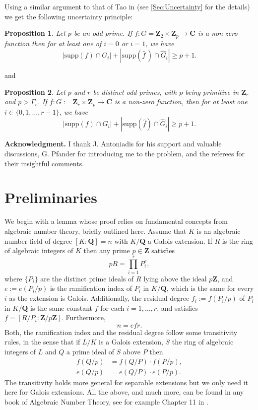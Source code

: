 \documentclass[10pt,a4paper]{amsart}
\newtheorem{proposition}{Proposition}
\def\Z{\mathbf{Z}}
\def\C{\mathbf{C}}
\def\Q{\mathbf{Q}}
\def\supp{\mathrm{supp}}
\begin{document}
Using a similar argument to that of Tao in \cite{Tao}
(see \autoref{Sec:Uncertainty} for the details) we get the following uncertainty  principle:
\begin{proposition}\label{Prop:Unc-A}
Let $ p$ be an odd prime. If $f: G= \Z_2 \times \Z_p \to \C $ is a non-zero function  then for at least one of $i=0 $ or $ i=1 $, we have 
\[
|\supp(f) \cap G_i| + |\supp(\widehat{f} \, ) \cap \widehat{G}_i| \geq p + 1.
\]
\end{proposition}
and 
\begin{proposition}\label{Prop:Unc-B}
Let $p$ and $r$ be distinct odd primes, with $p$ being primitive in $\Z_r$ and $p > \Gamma_r$. If $f: G:= \Z_r \times \Z_p \to \C$ is a non-zero function, then for at least one $i \in \{0, 1, \ldots, r-1\}$, we have 
\[
|\supp(f) \cap G_i| + |\supp(\widehat{f}) \cap \widehat{G}_i| \geq p + 1.
\]
\end{proposition}


{\bf Acknowledgment.}
I thank J. Antoniadis for his support and valuable discussions, G. Pfander for introducing me to the problem, and the referees for their insightful comments.


\section{Preliminaries}\label{Sec:prelim}

We begin with a lemma whose proof relies on fundamental concepts from algebraic number theory, briefly outlined here. Assume that $K$ is an  algebraic number field of degree $[K:\Q]=n$ with $K/\Q$ a Galois extension.  If $R$ is  the ring of algebraic  integers of $K$ then  any prime $p \in \Z$ satisfies  
\[
pR = \prod_{i=1}^r P_i^e, 
\]
where $\{ P_i \}$ are  the distinct prime ideals of $R$ lying above the ideal $p\Z$, and  $e:= e(P_i/p)$ is the ramification index of $P_i$ in $K/\Q$, which is the same for every $i$ as the extension is Galois.  Additionally, the residual degree $f_i:= f(P_i/p)$ of $P_i$ in $K/\Q$ is the same constant $f$ for each $i=1, \ldots, r$, and satisfies $f = [R/P_i : \Z/p\Z]$. Furthermore,
\begin{equation}\label{eq:efr}
 n=efr.   
\end{equation}
Both,  the ramification index and the residual degree follow some transitivity rules, in the sense that if $L/K$ is  a Galois extension, $S$ the ring of algebraic integers of $L$ and $Q$  a prime ideal of $S$ above $P$ then 
\begin{align*}
   f(Q/p)&= f(Q/P)\cdot f(P/p), \\
   e(Q/p)&= e(Q/P)\cdot e(P/p).
\end{align*}
The transitivity holds more general for separable extensions but we only need it here for Galois extensions.  All the above,  and much more, can be found in any book of Algebraic Number Theory, see for example Chapter 11 in \cite{Ribe}.
\end{document}
